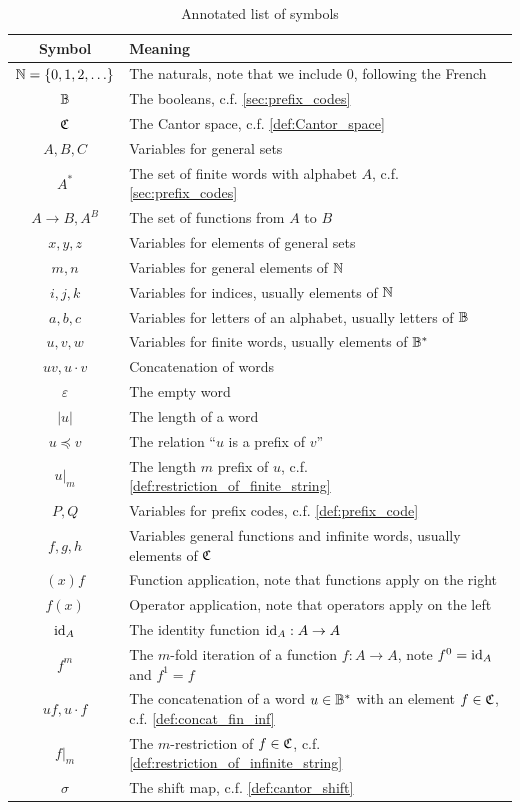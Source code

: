 \begin{table}[h]
  \centering
  \begin{tabular}{c|l}
    Symbol & Meaning  \\
    \hline
    ${\mathbb{N}} = \{0, 1,2,\ldots\}$ & The naturals, note that we include $0$, following the French\\
    $\mathbb{B}$ & The booleans, c.f. \cref{sec:prefix_codes}\\
    $\mathfrak{C}$ & The Cantor space, c.f. \cref{def:Cantor_space}\\
    $A, B, C$ & Variables for general sets\\
    $A^\ast$ & The set of finite words with alphabet $A$, c.f. \cref{sec:prefix_codes}\\
    $A\rightarrow B, A^B$ & The set of functions from $A$ to $B$\\
    $x, y, z$ & Variables for elements of general sets\\
    $m, n$ & Variables for general elements of ${\mathbb{N}}$\\
    $i, j, k$ & Variables for indices, usually elements of ${\mathbb{N}}$\\
    $a, b, c$ & Variables for letters of an alphabet, usually letters of $\mathbb{B}$\\
    $u, v, w$ & Variables for finite words, usually elements of $\mathbb{B}^\ast$\\
    $uv, u\cdot v$ & Concatenation of words\\
    $\varepsilon$ & The empty word\\
    $|u|$ & The length of a word\\
    $u \preceq v$ & The relation ``$u$ is a prefix of $v$''\\
    $u|_m$ & The length $m$ prefix of $u$, c.f. \cref{def:restriction_of_finite_string}\\
    $P, Q$ & Variables for prefix codes, c.f. \cref{def:prefix_code}\\
    $f, g, h$ & Variables general functions and infinite words, usually elements of $\mathfrak{C}$\\
    $(x)f$ & Function application, note that functions apply on the right\\
    $f(x)$ & Operator application, note that operators apply on the left\\
    $\textrm{id}_A$ & The identity function $\textrm{id}_A: A\rightarrow A$\\
    $f^m$ & The $m$-fold iteration of a function $f: A \rightarrow A$, note $f^0 = \textrm{id}_A$ and $f^1 = f$\\
    $uf, u\cdot f$ & The concatenation of a word $u\in \mathbb{B}^\ast$ with an element $f\in \mathfrak{C}$, c.f. \cref{def:concat_fin_inf}\\
    $f|_m$ & The $m$-restriction of $f\in \mathfrak{C}$, c.f. \cref{def:restriction_of_infinite_string}\\
    $\sigma$ & The shift map, c.f. \cref{def:cantor_shift}
  \end{tabular}
  \caption{Annotated list of symbols}%
  \label{tab:glossary_of_symbols}
\end{table}


